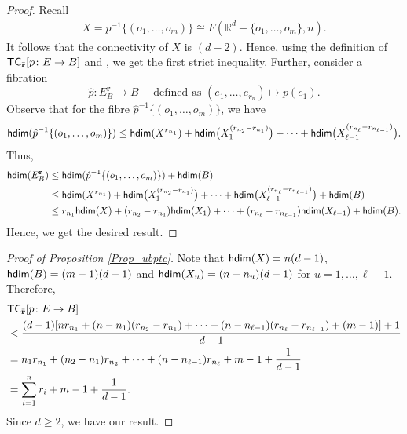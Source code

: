 \documentclass[12pt,oneside,reqno]{amsart}
\theoremstyle{plain}
\theoremstyle{definition}
\theoremstyle{remark}
\newcommand{\hdim}{{\sf {hdim}}}
\newcommand{\TC}{{\sf {TC}}}
\newcommand{\rr}{{\mathbb {R}}}
\begin{document}
\begin{proof}
Recall 
\begin{align*}
X = p^{-1}\{(o_1, \dots, o_m)\} \cong F(\rr^d-\{o_1,\ldots,o_m\},n). 
\end{align*}
It follows that the connectivity of $X$ is $(d-2)$. Hence, using the definition of $\TC_{\bar{\textbf{r}}}[p\colon E \to B]$ and \cite[Theorem 5]{Sva66}, we get the first strict inequality. 
Further, consider a fibration 
\begin{equation}\label{Eq_hat p}
\hat{p}\colon E^{\bar{\textbf{r}}}_B\to B \quad \text{ defined as } (e_1, \dots, e_{r_n})\mapsto p(e_1).
\end{equation}
Observe that for the fibre $\hat{p}^{-1}\{(o_1,\ldots,o_m)\}$, we have $$\hdim(\hat{p}^{-1}\{(o_1,\ldots,o_m)\}) \leq \hdim(X^{r_{n_1}}) + \hdim \big(X^{(r_{n_2} - r_{n_1})}_1\big) + \cdots + \hdim \big( X^{(r_{n_\ell} - r_{n_{\ell - 1}})}_{\ell - 1}\big).$$ 
Thus, 
\begin{align*}
\hdim(E^{\bar{\textbf{r}}}_B) & \leq \hdim(\hat{p}^{-1}\{(o_1,\ldots,o_m)\}) +\hdim(B) \\
& \leq \hdim(X^{r_{n_1}}) + \hdim\big(X^{(r_{n_2} - r_{n_1})}_1\big) + \cdots + \hdim \big(X^{(r_{n_\ell} - r_{n_{\ell - 1}})}_{\ell - 1}\big) + \hdim(B)\\
& \leq r_{n_1} \hdim (X) + (r_{n_2} - r_{n_1}) \hdim (X_1)+ \cdots + (r_{n_\ell} - r_{n_{\ell-1}}) \hdim (X_{\ell-1}) + \hdim (B). 
\end{align*}
Hence, we get the desired result.
\end{proof}



\begin{proof}[Proof of Proposition \ref{Prop_ubptc}]
Note that $\hdim(X) = n(d-1)$, $\hdim(B) = (m-1)(d-1)$ and $\hdim(X_u) = (n-n_u)(d-1)$ for $u= 1, \dots, \ell-1$. Therefore,
\begin{align*}
&\TC_{\bar{\textbf{r}}}[p\colon E \to B] \\
& < \frac{(d-1)[n r_{n_1} + (n - n_1) (r_{n_2} - r_{n_1}) + \cdots + (n - n_{\ell-1}) (r_{n_\ell} - r_{n_{\ell-1}}) + (m-1)] + 1}{d-1}\\
& = n_1 r_{n_1} + (n_2 - n_1) r_{n_2} + \cdots + (n - n_{\ell-1}) r_{n_\ell} + m -1 + \frac{1}{d-1}\\
& = \displaystyle\sum^{n}_{i=1} {r_i} + m -1 + \frac{1}{d-1}.
\end{align*}
Since $d\geq2$, we have our result.
\end{proof}
\end{document}
